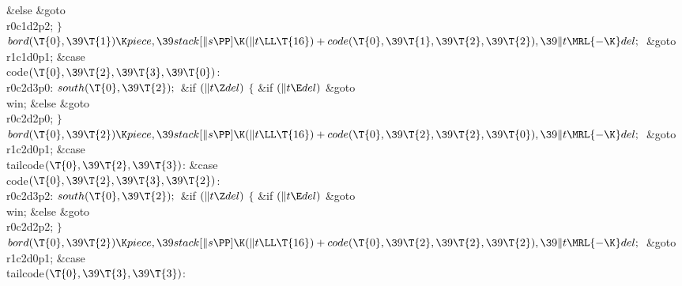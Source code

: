 \2\&{else}\1\5
\&{goto} \\{r0c1d2p2};\5
\2${}\}{}$\2\6
${}\\{bord}(\T{0},\39\T{1})\K\\{piece},\39\\{stack}[\|s\PP]\K(\|t\LL\T{16})+%
\\{code}(\T{0},\39\T{1},\39\T{2},\39\T{2}),\39\|t\MRL{-{\K}}\\{del};{}$\6
\&{goto} \\{r1c1d0p1};\6
\4\&{case} \\{code}${}(\T{0},\39\T{2},\39\T{3},\39\T{0}){}$:\5
\\{r0c2d3p0}:\5
${}\\{south}(\T{0},\39\T{2});{}$\6
\&{if} ${}(\|t\Z\\{del}){}$\5
${}\{{}$\5
\1\&{if} ${}(\|t\E\\{del}){}$\1\5
\&{goto} \\{win};\5
\2\&{else}\1\5
\&{goto} \\{r0c2d2p0};\5
\2${}\}{}$\2\6
${}\\{bord}(\T{0},\39\T{2})\K\\{piece},\39\\{stack}[\|s\PP]\K(\|t\LL\T{16})+%
\\{code}(\T{0},\39\T{2},\39\T{2},\39\T{0}),\39\|t\MRL{-{\K}}\\{del};{}$\6
\&{goto} \\{r1c2d0p1};\6
\4\&{case} \\{tailcode}${}(\T{0},\39\T{2},\39\T{3}){}$:\5
\&{case} \\{code}${}(\T{0},\39\T{2},\39\T{3},\39\T{2}){}$:\5
\\{r0c2d3p2}:\5
${}\\{south}(\T{0},\39\T{2});{}$\6
\&{if} ${}(\|t\Z\\{del}){}$\5
${}\{{}$\5
\1\&{if} ${}(\|t\E\\{del}){}$\1\5
\&{goto} \\{win};\5
\2\&{else}\1\5
\&{goto} \\{r0c2d2p2};\5
\2${}\}{}$\2\6
${}\\{bord}(\T{0},\39\T{2})\K\\{piece},\39\\{stack}[\|s\PP]\K(\|t\LL\T{16})+%
\\{code}(\T{0},\39\T{2},\39\T{2},\39\T{2}),\39\|t\MRL{-{\K}}\\{del};{}$\6
\&{goto} \\{r1c2d0p1};\6
\4\&{case} \\{tailcode}${}(\T{0},\39\T{3},\39\T{3}){}$:\5
